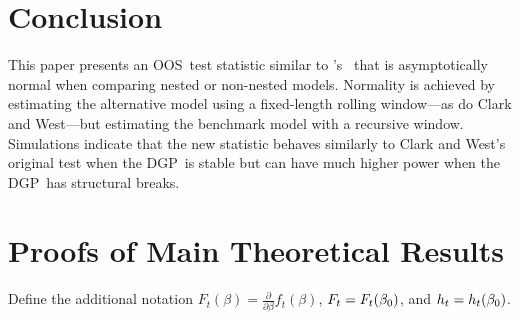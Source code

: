 \documentclass[12pt,fleqn]{article}
\newcommand\poscw{\citeauthor{ClW:06}'s \citeyearpar{ClW:06,ClW:07}}
\theoremstyle{definition}
\DeclareMathOperator{\E}{E}
\newcommand{\btrue}[1][]{\if#1*\hat\beta_{T+1}\else\beta_0\fi}
\newcommand{\osum}[1]{\sum_{#1=R+1}^T}
\newcommand{\oclt}[1]{\tfrac{1}{\sqrt{P}} \osum{#1}}
\newcommand{\dgp}{DGP}
\newcommand{\oos}{OOS}
\begin{document}
\section{Conclusion}\label{sec:4}
This paper presents an \oos\ test statistic similar to \poscw\ that is
asymptotically normal when comparing nested or non-nested models.
Normality is achieved by estimating the alternative model using a
fixed-length rolling window---as do Clark and West---but estimating
the benchmark model with a recursive window.  Simulations indicate
that the new statistic behaves similarly to Clark and West's original
test when the \dgp\ is stable but can have much higher power when the 
\dgp\ has structural breaks.

\appendix
\section{Proofs of Main Theoretical Results}
\label{sec:B}

\newcommand{\WesA}[1][]{\oclt{t}
  (F_t^{#1} - \E^{#1} F_t^{#1}) B^{#1} H_t^{#1}}
\newcommand{\WesB}[1][]{\tfrac{1}{\sqrt{P}} \E^{#1} F_t^{#1} \osum{t} (B_t^{#1} -
  B^{#1}) H_t^{#1}}
\newcommand{\WesC}[1][]{\oclt{t}
  (F_t^{#1} - \E^{#1} F_t^{#1}) (B_t^{#1} - B^{#1}) H_t^{#1}}

Define the additional notation 
$F_t(\beta) = \tfrac{\partial}{\partial \beta} f_t(\beta)$,
$F_t = F_t(\btrue)$,
and
$h_t = h_t(\btrue)$.
    
\end{document}
